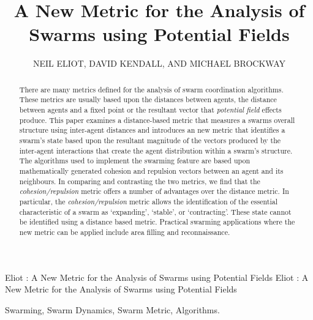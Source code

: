 \documentclass{ieeeaccess}
\begin{document}

\title{A New Metric for the Analysis of Swarms using Potential Fields}
\author{\uppercase{Neil Eliot},
\uppercase{David Kendall, and Michael Brockway}}
\address[1]{Northumbria University, Department of Computing and Information Sciences, 
Newcastle upon Tyne, NE1 8ST}

\markboth
{Eliot \headeretal: A New Metric for the Analysis of Swarms using Potential Fields}
{Eliot \headeretal: A New Metric for the Analysis of Swarms using Potential Fields}



\begin{abstract}
  There are many metrics defined for the analysis of swarm coordination algorithms. These metrics are usually based upon the distances between agents, the distance between agents and a fixed point or the resultant vector that \textit{potential field} effects produce. This paper examines a distance-based metric that measures a swarms overall structure using inter-agent distances and introduces an new metric that identifies a swarm's state based upon the resultant magnitude of the vectors produced by the inter-agent interactions that create the agent distribution within a swarm's structure. The algorithms used to implement the swarming feature are based upon mathematically generated cohesion and repulsion vectors between an agent and its neighbours. In comparing and contrasting the two metrics, we find that the \textit{cohesion/repulsion} metric offers a number of advantages over the distance metric. In particular, the \textit{cohesion/repulsion} metric allows the identification of the essential characteristic of a swarm as `expanding', `stable', or `contracting'. These state cannot be identified using a distance based metric. Practical swarming applications where the new metric can be applied include area filling and reconnaissance.
\end{abstract}

\begin{keywords}
Swarming, Swarm Dynamics, Swarm Metric, Algorithms.
\end{keywords}
\end{document}
